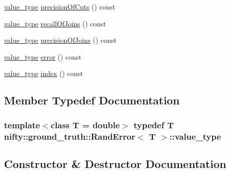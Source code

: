 \begin{DoxyCompactItemize}
\item 
\hyperlink{classnifty_1_1ground__truth_1_1RandError_a8ccf604387e3b5ed939c97c22c75acf9}{value\+\_\+type} \hyperlink{classnifty_1_1ground__truth_1_1RandError_a265473d172eb9edfae12ec6641932ed5}{precision\+Of\+Cuts} () const 
\item 
\hyperlink{classnifty_1_1ground__truth_1_1RandError_a8ccf604387e3b5ed939c97c22c75acf9}{value\+\_\+type} \hyperlink{classnifty_1_1ground__truth_1_1RandError_acd1e46b27ba981f8a56f0e56e37eb439}{recall\+Of\+Joins} () const 
\item 
\hyperlink{classnifty_1_1ground__truth_1_1RandError_a8ccf604387e3b5ed939c97c22c75acf9}{value\+\_\+type} \hyperlink{classnifty_1_1ground__truth_1_1RandError_a5d7b48ee15484fd4727cf866de6e37db}{precision\+Of\+Joins} () const 
\item 
\hyperlink{classnifty_1_1ground__truth_1_1RandError_a8ccf604387e3b5ed939c97c22c75acf9}{value\+\_\+type} \hyperlink{classnifty_1_1ground__truth_1_1RandError_a6ab1ff8964918590f45508e799eb9a11}{error} () const 
\item 
\hyperlink{classnifty_1_1ground__truth_1_1RandError_a8ccf604387e3b5ed939c97c22c75acf9}{value\+\_\+type} \hyperlink{classnifty_1_1ground__truth_1_1RandError_ac00ee6eaccaeced31ccdef585003aa43}{index} () const 
\end{DoxyCompactItemize}


\subsection{Member Typedef Documentation}
\hypertarget{classnifty_1_1ground__truth_1_1RandError_a8ccf604387e3b5ed939c97c22c75acf9}{}
\subsubsection[{value\+\_\+type}]{\setlength{\rightskip}{0pt plus 5cm}template$<$class T  = double$>$ typedef T {\bf nifty\+::ground\+\_\+truth\+::\+Rand\+Error}$<$ T $>$\+::{\bf value\+\_\+type}}\label{classnifty_1_1ground__truth_1_1RandError_a8ccf604387e3b5ed939c97c22c75acf9}


\subsection{Constructor \& Destructor Documentation}
\hypertarget{classnifty_1_1ground__truth_1_1RandError_a4ad5e727b3445b52cfe87e5f5cd68a2f}{}

